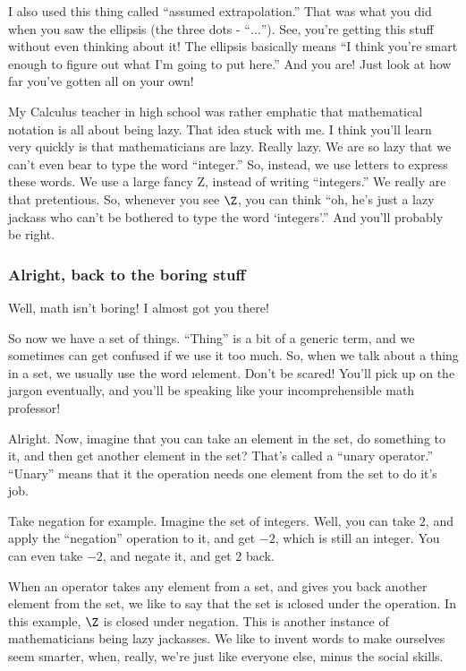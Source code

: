 I also used this thing called ``assumed extrapolation.'' That was what you did
when you saw the ellipsis (the three dots - ``$\ldots$''). See, you're getting
this stuff without even thinking about it! The ellipsis basically means ``I
think you're smart enough to figure out what I'm going to put here.'' And you
are! Just look at how far you've gotten all on your own!

My Calculus teacher in high school was rather emphatic that mathematical
notation is all about being lazy. That idea stuck with me. I think you'll learn
very quickly is that mathematicians are lazy. Really lazy. We are so lazy that
we can't even bear to type the word ``integer.'' So, instead, we use letters to
express these words. We use a large fancy Z, instead of writing ``integers.'' We
really are that pretentious. So, whenever you see $\Z$, you can think ``oh, he's
just a lazy jackass who can't be bothered to type the word `integers'.'' And
you'll probably be right.

\subsubsection{Alright, back to the boring stuff}

Well, math isn't boring! I almost got you there!

So now we have a set of things. ``Thing'' is a bit of a generic term, and we
sometimes can get confused if we use it too much. So, when we talk about a thing
in a set, we usually use the word \i{element}. Don't be scared! You'll pick up
on the jargon eventually, and you'll be speaking like your incomprehensible math
professor!

Alright. Now, imagine that you can take an element in the set, do something to
it, and then get another element in the set? That's called a ``unary operator.''
``Unary'' means that it the operation needs one element from the set to do it's
job.

Take negation for example. Imagine the set of integers. Well, you can take $2$,
and apply the ``negation'' operation to it, and get $-2$, which is still an
integer. You can even take $-2$, and negate it, and get $2$ back.

When an operator takes any element from a set, and gives you back another
element from the set, we like to say that the set is \i{closed} under the
operation. In this example, $\Z$ is closed under negation. This is another
instance of mathematicians being lazy jackasses. We like to invent words to make
ourselves seem smarter, when, really, we're just like everyone else, minus the
social skills.


